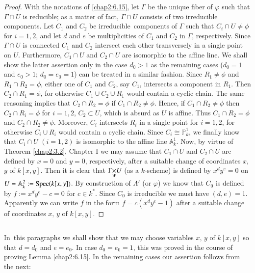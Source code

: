 \begin{proof}
With the notations of \ref{chap2:6.15}, let $\Gamma$ be the unique fiber of
$\varphi$ such that $\Gamma\cap U$ is reducible; as a matter of fact,
$\Gamma\cap U$ consists of two irreducible components. Let $C_{1}$ and
$C_{2}$ be irreducible\pageoriginale\ components of $\Gamma$ such that
$C_{i}\cap U\neq \phi$ for $i=1,2$, and let $d$ and $e$ be
multiplicities of $C_{1}$ and $C_{2}$ in $\Gamma$, respectively. Since
$\Gamma\cap U$ is connected $C_{1}$ and $C_{2}$ intersect each other
transversely in a single point on $U$. Furthermore, $C_{1}\cap U$ and
$C_{2}\cap U$ are isomorphic to the affine line. We shall show the
latter assertion only in the case $d_{0}>1$ as the remaining cases
($d_{0}=1$ and $e_{0}>1$; $d_{0}=e_{0}=1$) can be treated in a similar
fashion. Since $R_{1}\neq \phi$ and $R_{1}\cap R_{2}=\phi$, either one
of $C_{1}$ and $C_{2}$, say $C_{1}$, intersects a component in
$R_{1}$. Then $C_{2}\cap R_{1}=\phi$, for otherwise $C_{1}\cup
C_{2}\cup R_{1}$ would contain a cyclic chain. The same reasoning
implies that $C_{2}\cap R_{2}=\phi$ if $C_{1}\cap R_{2}\neq
\phi$. Hence, if $C_{1}\cap R_{2}\neq \phi$ then $C_{2}\cap
R_{i}=\phi$ for $i=1,2$, \iec $C_{2}\subset U$, which is absurd as $U$
is affine. Thus $C_{1}\cap R_{2}=\phi$ and $C_{2}\cap R_{2}\neq
\phi$. Moreover, $C_{i}$ intersects $R_{i}$ in a single point for
$i=1,2$, for otherwise $C_{i}\cup R_{i}$ would contain a cyclic
chain. Since $C_{i}\cong \mathbb{P}^{1}_{k}$, we finally know that
$C_{i}\cap U$ $(i=1,2)$ is isomorphic to the affine line
$\mathbb{A}^{1}_{k}$. Now, by virtue of Theorem \ref{chap2:3.2}, Chapter
I we may assume that $C_{1}\cap U$ and $C_{2}\cap U$ are defined by
$x=0$ and $y=0$, respectively, after a suitable change of coordinates
$x$, $y$ of $k[x,y]$. Then it is clear that $\fprod{\Gamma}{U}{W}$ (as
a $k$-scheme) is defined by $x^{d}y^{e}=0$ on
$U=\mathbb{A}^{2}_{k}:=\operatorname{Spec}(k[x,y])$. By construction of $\Lambda'$
(or $\varphi$) we know that $C_{0}$ is defined by $f:=x^{d}y^{e}-c=0$
for $c\in k^{\ast}$. Since $C_{0}$ is irreducible we must have
$(d,e)=1$. Apparently we can write $f$ in the form $f=c(x^{d}y^{e}-1)$
after a suitable change of coordinates $x$, $y$ of $k[x,y]$.
\end{proof}

\subsection{}\label{chap2:6.17}
In\pageoriginale\ this paragraphs we shall show that we may choose
variables $x$, $y$ of $k[x,y]$ so that $d=d_{0}$ and $e=e_{0}$. In
case $d_{0}=e_{0}=1$, this was proved in the course of proving Lemma
\ref{chap2:6.15}. In the remaining cases our assertion follows from the
next:  

